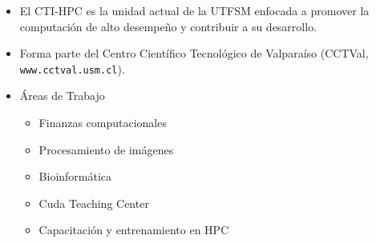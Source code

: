 \frame
{
\frametitle{}
        \begin{itemize}
	    \item El CTI-HPC es la unidad actual de la UTFSM enfocada a promover la computación de alto desempeño y contribuir a su desarrollo.
	    \item Forma parte del Centro Científico Tecnológico de Valparaíso (CCTVal, \texttt{www.cctval.usm.cl}).
	    \item Áreas de Trabajo	
		\begin{itemize}
		\item Finanzas computacionales
		\item Procesamiento de imágenes
		\item Bioinformática
		\item Cuda Teaching Center
		\item Capacitación y entrenamiento en HPC
		\end{itemize}
        \end{itemize}
}
